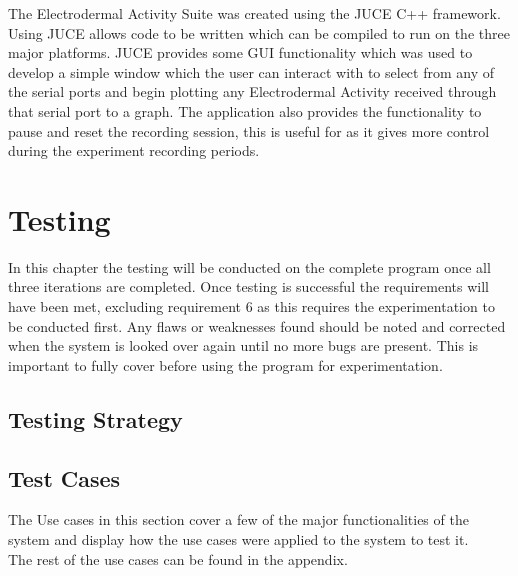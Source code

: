 \documentclass{report}
\begin{document}
The Electrodermal Activity Suite was created using the JUCE C++ framework. Using JUCE allows code to be written which can be compiled to run on the three major platforms.
JUCE provides some GUI functionality which was used to develop a simple window which the user can interact with to select from any of the serial ports and begin
plotting any Electrodermal Activity received through that serial port to a graph. The application also provides the functionality to pause and reset the recording 
session, this is useful for as it gives more control during the experiment recording periods.

\chapter{Testing}

In this chapter the testing will be conducted on the complete program once all three iterations are 
completed. Once testing is successful the requirements will have been met, excluding requirement 6
as this requires the experimentation to be conducted first.
Any flaws or weaknesses found should be noted and corrected when the system is looked over again 
until no more bugs are present. This is important to fully cover before using the program for 
experimentation.

\section{Testing Strategy}

\section{Test Cases}
The Use cases in this section cover a few of the major functionalities of the system and display how
the use cases were applied to the system to test it.\\
The rest of the use cases can be found in the appendix.
\end{document}
